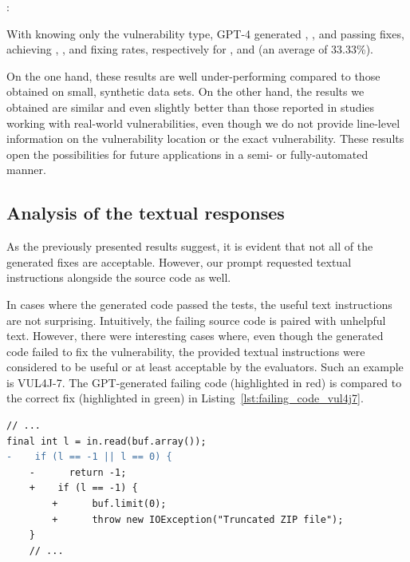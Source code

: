 \begin{framed}
\noindent {}: \textbf{\secondthesisrqone}

\noindent With knowing only the vulnerability type, GPT-4 generated , , and  passing fixes, achieving , , and  fixing rates, respectively for ,  and  (an average of 33.33\%\xspace).

\noindent On the one hand, these results are well under-performing compared to those obtained on small, synthetic data sets.
On the other hand, the results we obtained are similar and even slightly better than those reported in studies working with real-world vulnerabilities, even though we do not provide line-level information on the vulnerability location or the exact vulnerability.
These results open the possibilities for future applications in a semi- or fully-automated manner.
\end{framed}

\subsection{Analysis of the textual responses}

As the previously presented results suggest, it is evident that not all of the generated fixes are acceptable.
However, our prompt requested textual instructions alongside the source code as well.

In cases where the generated code passed the tests, the useful text instructions are not surprising.
Intuitively, the failing source code is paired with unhelpful text.
However, there were interesting cases where, even though the generated code failed to fix the vulnerability, the provided textual instructions were considered to be useful or at least acceptable by the evaluators.
Such an example is VUL4J-7.
The GPT-generated failing code (highlighted in red) is compared to the correct fix (highlighted in green) in Listing~\ref{lst:failing_code_vul4j7}.

\begin{lstlisting}[caption={GPT-4 generated failing fix for VUL4J-7 in \run{1}},label=lst:failing_code_vul4j7,captionpos=b, keepspaces=true, language=diff]
// ...
final int l = in.read(buf.array());
-    if (l == -1 || l == 0) {
	-      return -1;
	+    if (l == -1) {
		+      buf.limit(0);
		+      throw new IOException("Truncated ZIP file");
	}
	// ...
\end{lstlisting}

